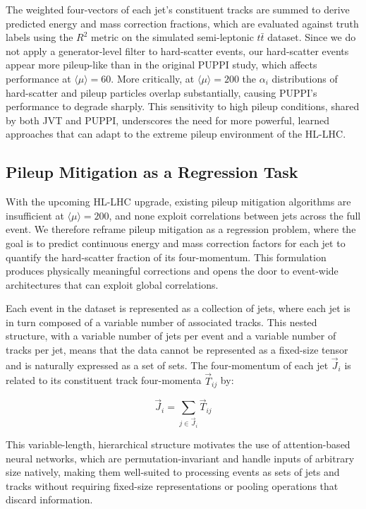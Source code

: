 The weighted four-vectors of each jet's constituent tracks are summed to derive predicted energy and mass correction fractions, which are evaluated against truth labels using the $R^2$ metric on the simulated semi-leptonic $t\bar{t}$ dataset. 
Since we do not apply a generator-level filter to hard-scatter events, our hard-scatter events appear more pileup-like than in the original PUPPI study, which affects performance at $\langle\mu\rangle=60$. 
More critically, at $\langle\mu\rangle=200$ the $\alpha_i$ distributions of hard-scatter and pileup particles overlap substantially, causing PUPPI's performance to degrade sharply. 
This sensitivity to high pileup conditions, shared by both JVT and PUPPI, underscores the need for more powerful, learned approaches that can adapt to the extreme pileup environment of the HL-LHC.

\subsection{Pileup Mitigation as a Regression Task}\label{JetLabels}

With the upcoming HL-LHC upgrade, existing pileup mitigation algorithms are insufficient at $\langle\mu\rangle=200$, and none exploit correlations between jets across the full event.
We therefore reframe pileup mitigation as a regression problem, where the goal is to predict continuous energy and mass correction factors for each jet to quantify the hard-scatter fraction of its four-momentum.
This formulation produces physically meaningful corrections and opens the door to event-wide architectures that can exploit global correlations.

Each event in the dataset is represented as a collection of jets, where each jet is in turn composed of a variable number of associated tracks. 
This nested structure, with a variable number of jets per event and a variable number of tracks per jet, means that the data cannot be represented as a fixed-size tensor and is naturally expressed as a set of sets. 
The four-momentum of each jet $\overrightarrow{J}_i$ is related to its constituent track four-momenta $\overrightarrow{T}_{ij}$ by:

\begin{equation}
  \overrightarrow{J}_i = \sum\limits_{j \in \overrightarrow{J}_i} \overrightarrow{T}_{ij}
\end{equation}

This variable-length, hierarchical structure motivates the use of attention-based neural networks, which are permutation-invariant and handle inputs of arbitrary size natively, making them well-suited to processing events as sets of jets and tracks without requiring fixed-size representations or pooling operations that discard information.

